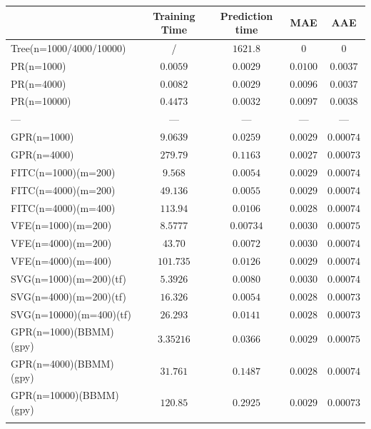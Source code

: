 \documentclass[12pt,a4paper,oneside]{book}
\begin{document}
\begin{table}\centering 
\begin{tabular}[t]{lcccc}\toprule
            &   Training Time  &  Prediction time &  MAE & AAE   \\ \midrule
Tree(n=1000/4000/10000)    &/ & $1621.8$ &  $0$  &  $0$    \\\addlinespace
PR(n=1000)   & $0.0059$ & $0.0029$    & $0.0100$ & $0.0037$     \\\addlinespace
PR(n=4000)   & $0.0082$ &  $0.0029$   & $0.0096$ &  $0.0037$   \\\addlinespace
PR(n=10000)	  & $0.4473$ &  $0.0032$   & $0.0097$ &  $0.0038$     \\\addlinespace
\qquad \qquad \qquad \qquad \qquad ---	  &   --- & --- & --- & ---     \\\addlinespace
GPR(n=1000)   & $9.0639$ &  $0.0259$   & $0.0029$ & $0.00074$    \\\addlinespace
GPR(n=4000)   & $279.79$ &  $0.1163$   & $\bm{0.0027}$ & $\bm{0.00073}$     \\\addlinespace
FITC(n=1000)(m=200)  & $9.568$  & $\bm{0.0054}$    & $0.0029$ & $0.00074$  \\\addlinespace
FITC(n=4000)(m=200)   & $49.136$ & $0.0055$    & $0.0029$ & $0.00074$    \\\addlinespace
FITC(n=4000)(m=400)	 & $113.94$ &  $0.0106$   & $0.0028$ & $0.00074$    \\\addlinespace
VFE(n=1000)(m=200)  & $8.5777$ &  $0.00734$   & $0.0030$ & $0.00075$  \\\addlinespace
VFE(n=4000)(m=200) & $43.70$ & $0.0072$    & $0.0030$ & $0.00074$ \\\addlinespace
VFE(n=4000)(m=400)	 & $101.735$  & $0.0126$    & $0.0029$ & $0.00074$\\\addlinespace
SVG(n=1000)(m=200)(tf)   & $5.3926$ & $0.0080$    & $0.0030$ & $0.00074$   \\\addlinespace
SVG(n=4000)(m=200)(tf)  & $16.326$ &  $0.0054$   & $0.0028$  & $\bm{0.00073}$  \\\addlinespace
SVG(n=10000)(m=400)(tf)	  & $26.293$  & $0.0141$    & $0.0028$  & $0.00073$  \\\addlinespace
GPR(n=1000)(BBMM)(gpy)  & $\bm{3.35216}$ &  $0.0366$   & $0.0029$ & $0.00075$      \\\addlinespace
GPR(n=4000)(BBMM)(gpy)  & $31.761$ & $0.1487$    & $0.0028$ & $0.00074$  \\\addlinespace
GPR(n=10000)(BBMM)(gpy)  & $120.85$ & $0.2925$    & $0.0029$ &  $\bm{0.00073}$ \\\addlinespace

\end{tabular}
\end{table}
\end{document}

